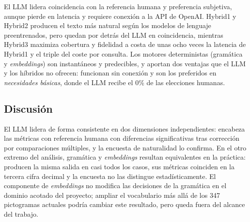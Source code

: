 \begin{table}[ht]
\centering
{}
\caption{Mejor motor por dimensión evaluada. Los valores entre paréntesis sitúan la magnitud del liderazgo frente a las bases.}
\label{tab:eval-ranking}
\end{table}

\noindent El LLM lidera coincidencia con la referencia humana y preferencia subjetiva, aunque pierde en latencia y requiere conexión a la API de OpenAI. Hybrid1 y Hybrid2 producen el texto más natural según los modelos de lenguaje preentrenados, pero quedan por detrás del LLM en coincidencia, mientras Hybrid3 maximiza cobertura y fidelidad a costa de unas ocho veces la latencia de Hybrid1 y el triple del coste por consulta. Los motores deterministas (gramática y \textit{embeddings}) son instantáneos y predecibles, y aportan dos ventajas que el LLM y los híbridos no ofrecen: funcionan sin conexión y son los preferidos en \textit{necesidades básicas}, donde el LLM recibe el 0\% de las elecciones humanas.

\subsection{Discusión}
\label{sec:eval-discusion}

El LLM lidera de forma consistente en dos dimensiones independientes: encabeza las métricas con referencia humana con diferencias significativas tras corrección por comparaciones múltiples, y la encuesta de naturalidad lo confirma. En el otro extremo del análisis, gramática y \textit{embeddings} resultan equivalentes en la práctica: producen la misma salida en casi todos los casos, sus métricas coinciden en la tercera cifra decimal y la encuesta no las distingue estadísticamente. El componente de \textit{embeddings} no modifica las decisiones de la gramática en el dominio acotado del proyecto; ampliar el vocabulario más allá de los 347 pictogramas actuales podría cambiar este resultado, pero queda fuera del alcance del trabajo.

